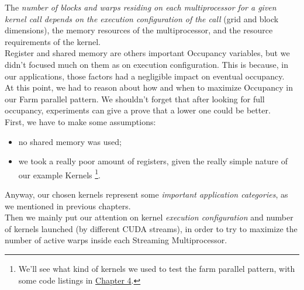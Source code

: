 	The \textit{number of blocks and warps residing on each multiprocessor for a given kernel call depends on the execution configuration of the call} (grid and block dimensions), the memory resources of the multiprocessor, and the resource requirements of the kernel\cite{cudaguide}.\\
	Register and shared memory are others important Occupancy variables, but we didn't focused much on them as on execution configuration. This is because, in our applications, those factors had a negligible impact on eventual occupancy.\\

At this point, we had to reason about how and when to maximize Occupancy in our Farm parallel pattern. We shouldn't forget that after looking for full occupancy, experiments can give a prove that a lower one could be better.\\
First, we have to make some assumptions:
\begin{itemize}
	\item no shared memory was used;
	\item we took a really poor amount of registers, given the really simple nature of our example Kernels \footnote{We'll see what kind of kernels we used to test the farm parallel pattern, with some code listings in \hyperref[chap:impl]{Chapter 4}.}.
\end{itemize}  
Anyway, our chosen kernels represent some \textit{important application categories}, as we mentioned in previous chapters.\\
Then we mainly put our attention on kernel \textit{execution configuration} and number of kernels launched (by different CUDA streams), in order to try to maximize the number of active warps inside each Streaming Multiprocessor.

